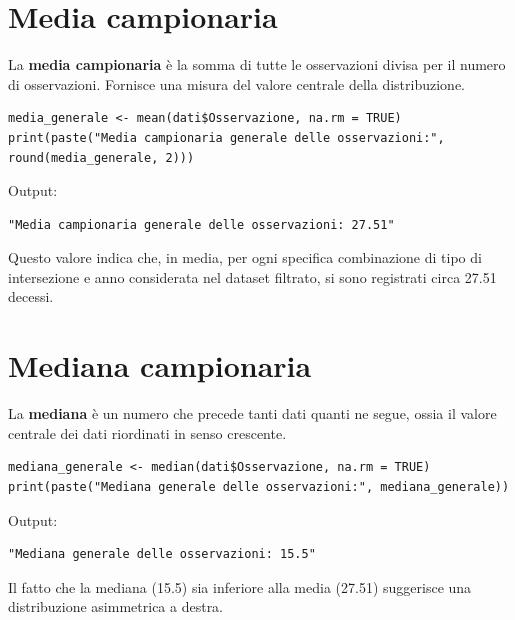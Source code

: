 \documentclass[14pt, openany, titlepage]{report} %
\begin{document}
\section{Media campionaria}
La \textbf{media campionaria} è la somma di tutte le osservazioni divisa per il numero di osservazioni.
 Fornisce una misura del valore centrale della distribuzione.
\begin{center}
\begin{lstlisting}[breaklines=true]
media_generale <- mean(dati$Osservazione, na.rm = TRUE)
print(paste("Media campionaria generale delle osservazioni:", round(media_generale, 2)))
\end{lstlisting}  
\end{center}
\noindent
Output: 
\begin{verbatim}
"Media campionaria generale delle osservazioni: 27.51"
\end{verbatim}
Questo valore indica che, in media, per ogni specifica combinazione di tipo di intersezione e anno considerata nel dataset filtrato, si sono registrati circa 27.51 decessi.

\section{Mediana campionaria}
La \textbf{mediana} è un numero che precede tanti dati quanti ne segue, ossia il 
valore centrale dei dati riordinati in senso crescente.
\begin{center}
\begin{lstlisting}[breaklines=true]
mediana_generale <- median(dati$Osservazione, na.rm = TRUE)
print(paste("Mediana generale delle osservazioni:", mediana_generale))
\end{lstlisting}  
\end{center}
\noindent
Output:
\begin{verbatim}
"Mediana generale delle osservazioni: 15.5"
\end{verbatim}
 Il fatto che la mediana (15.5)
 sia inferiore alla media (27.51) suggerisce una distribuzione 
 asimmetrica a destra.
\end{document}
